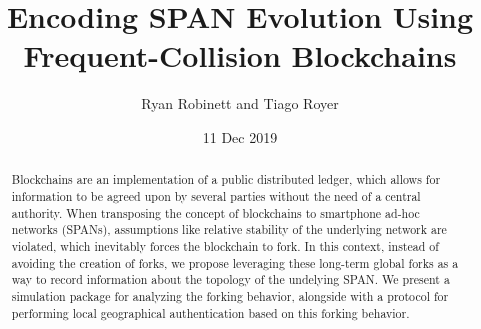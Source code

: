 \documentclass[twocolumn,10pt]{article}
\begin{document}
\title{Encoding SPAN Evolution Using Frequent-Collision Blockchains}
\author{Ryan Robinett and Tiago Royer}
\date{11 Dec 2019}
\maketitle

\begin{abstract}
	Blockchains are an implementation of a public distributed ledger,
	which allows for information to be agreed upon by several parties
	without the need of a central authority.
	When transposing the concept of blockchains to smartphone ad-hoc networks (SPANs),
	assumptions like relative stability of the underlying network are violated,
	which inevitably forces the blockchain to fork.
	In this context,
	instead of avoiding the creation of forks,
	we propose leveraging these long-term global forks
	as a way to record information about the topology of the undelying SPAN.
	We present a simulation package for analyzing the forking behavior,
	alongside with a protocol for performing local geographical authentication
	based on this forking behavior.
\end{abstract}



















\end{document}
